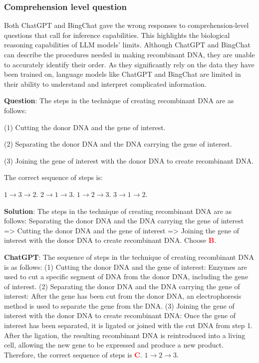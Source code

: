 \documentclass{article}
\begin{document}
{\begin{mdframed}[linewidth=1pt,linecolor=red]
	\end{mdframed}	
	
	\subsubsection{Comprehension level question}
	\label{VNHSGE_Bio_C}
	
	Both ChatGPT and BingChat gave the wrong responses to comprehension-level questions that call for inference capabilities. This highlights the biological reasoning capabilities of LLM models' limits. Although ChatGPT and BingChat can describe the procedures needed in making recombinant DNA, they are unable to accurately identify their order. As they significantly rely on the data they have been trained on, language models like ChatGPT and BingChat are limited in their ability to understand and interpret complicated information.
	
	
	
	\begin{mdframed}[linewidth=1pt,linecolor=red] \textbf{Question}: The steps in the technique of creating recombinant DNA are as follows:
		
		(1) Cutting the donor DNA and the gene of interest.
		
		(2) Separating the donor DNA and the DNA carrying the gene of interest.
		
		(3) Joining the gene of interest with the donor DNA to create recombinant DNA.
		
		The correct sequence of steps is: 
		
		\begin{oneparchoices}
			\choice $1 \rightarrow 3 \rightarrow 2$.
			\choice $2 \rightarrow 1 \rightarrow 3$.	
			\choice $1 \rightarrow 2 \rightarrow 3$.
			\choice $3 \rightarrow 1 \rightarrow 2 $.
		\end{oneparchoices}
		
		\textbf{Solution}: The steps in the technique of creating recombinant DNA are as follows: Separating the donor DNA and the DNA carrying the gene of interest => Cutting the donor DNA and the gene of interest => Joining the gene of interest with the donor DNA to create recombinant DNA. Choose \textcolor{red}{\textbf{B}}. 
		
		\textbf{ChatGPT}: The sequence of steps in the technique of creating recombinant DNA is as follows:
		(1) Cutting the donor DNA and the gene of interest: Enzymes are used to cut a specific segment of DNA from the donor DNA, including the gene of interest.
		(2) Separating the donor DNA and the DNA carrying the gene of interest: After the gene has been cut from the donor DNA, an electrophoresis method is used to separate the gene from the DNA.
		(3) Joining the gene of interest with the donor DNA to create recombinant DNA: Once the gene of interest has been separated, it is ligated or joined with the cut DNA from step 1. After the ligation, the resulting recombinant DNA is reintroduced into a living cell, allowing the new gene to be expressed and produce a new product.
		Therefore, the correct sequence of steps is \textcolor{red}{\textbf{C}}. $1 \rightarrow 2 \rightarrow 3$.
		

\end{mdframed}}
\end{document}
